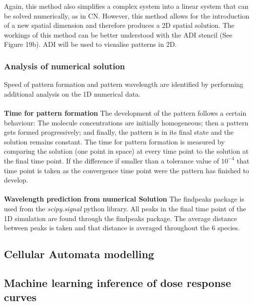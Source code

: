 Again, this method also simplifies a complex system into a linear system that can be solved numerically, as in CN. However, this method allows for the introduction of a new spatial dimension and therefore produces a 2D spatial solution. The workings of this method can be better understood with the ADI stencil (See Figure 19b). ADI will be used to visualise patterns in 2D.
\subsubsection{Analysis of numerical solution}
Speed of pattern formation and pattern wavelength are identified by performing additional analysis on the 1D numerical data.  \\\\
\textbf{Time for pattern formation}
The development of the pattern follows a certain behaviour: The molecule concentrations are initially homogeneous; then a pattern gets formed progressively; and finally, the pattern is in its final state and the solution remains constant.  The time for pattern formation is measured by comparing the solution (one point in space) at every time point to the solution at the final time point. If the difference if smaller than a tolerance value of $10^{-4}$ that time point is taken as the convergence time point were the pattern has finished to  develop. \\\\
\textbf{Wavelength prediction from numerical Solution}
The findpeaks package is used from the \textit{scipy.signal} python library. All peaks in the final time point of the 1D simulation are found through the findpeaks package. The average distance between peaks is taken and that distance is averaged throughout the 6 species.

\subsection{Cellular Automata modelling}

\subsection{Machine learning inference of dose response curves}